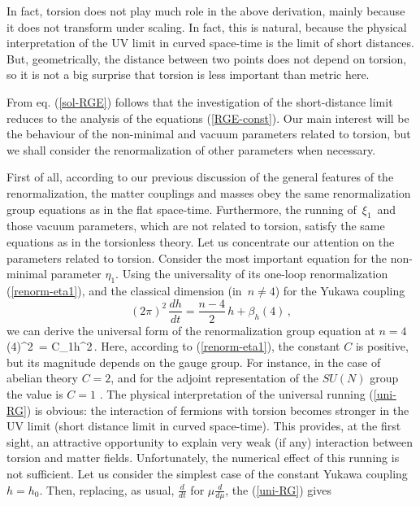 In fact, torsion does not play much role in the 
above derivation, mainly because it does not transform under 
scaling. In fact, this is natural, because the physical 
interpretation of the UV limit in curved space-time is the 
limit of short distances. But, geometrically, the distance between 
two points does not depend on torsion, so it is not a big
surprise that torsion is less important than metric here. 

From eq. (\ref{sol-RGE}) follows that the investigation of the 
short-distance limit reduces to the analysis of 
the equations (\ref{RGE-const}). Our main interest will be the 
behaviour of the non-minimal and vacuum parameters related to 
torsion, but we shall consider the renormalization of other 
parameters when necessary.  

First of all, according to our previous discussion of the 
general features of the renormalization, the 
matter couplings and masses obey the same renormalization 
group equations as in the flat space-time. Furthermore, the 
running of  $\,\xi_1\,$ and those vacuum parameters, 
which are not related to torsion, satisfy the same equations 
as in the torsionless theory. Let us concentrate our attention 
on the parameters related to torsion.
Consider the most important equation for the 
non-minimal parameter $\eta_1$. Using the universality 
of its one-loop renormalization (\ref{renorm-eta1}), 
and the classical dimension (in $\,n\neq 4$) for the
Yukawa coupling 
$$
(2\pi)^2\,\frac{dh}{dt}=\frac{n-4}{2}\,h + \beta_h(4)\,,
$$ 
we can derive the universal form of the renormalization 
group equation at $n=4$ 
\beq
(4\pi)^2\, = C\eta_1h^2\,.
\label{uni-RG}
\eeq
Here, according to (\ref{renorm-eta1}), the constant $C$ is 
positive, but its magnitude depends on the gauge group. 
For instance, in the case of abelian theory $C=2$, and for the 
adjoint representation of the $SU(N)$ group the value is
$C=1$ \cite{sh-alexeev}. The physical interpretation of the
universal running (\ref{uni-RG}) is obvious: the 
interaction of fermions with torsion becomes stronger in 
the UV limit (short distance limit in curved space-time). 
This provides, at the first sight, an attractive opportunity 
to explain very weak (if any) interaction between torsion and
matter fields. Unfortunately, the numerical effect of
this running is not sufficient. Let us consider the simplest 
case of the constant Yukawa coupling $h=h_0$. Then, 
replacing, as usual, $\frac{d}{dt}$ for $\mu\frac{d}{d\mu}$, 
the (\ref{uni-RG}) gives 


